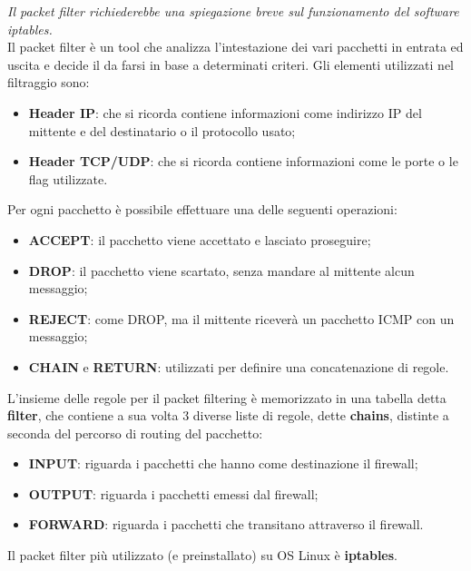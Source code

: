            \emph{Il packet filter richiederebbe una spiegazione breve sul funzionamento del software iptables.}\\

            Il packet filter è un tool che analizza l’intestazione dei vari pacchetti in entrata ed uscita e decide
            il da farsi in base a determinati criteri. Gli elementi utilizzati nel filtraggio sono:

            \begin{itemize}
                \item \textbf{Header IP}: che si ricorda contiene informazioni come indirizzo IP del mittente e del
                destinatario o il protocollo usato;
                \item \textbf{Header TCP/UDP}: che si ricorda contiene informazioni come le porte o le flag utilizzate.
            \end{itemize}

            Per ogni pacchetto è possibile effettuare una delle seguenti operazioni:

            \begin{itemize}
                \item \textbf{ACCEPT}: il pacchetto viene accettato e lasciato proseguire;
                \item \textbf{DROP}: il pacchetto viene scartato, senza mandare al mittente alcun messaggio;
                \item \textbf{REJECT}: come DROP, ma il mittente riceverà un pacchetto ICMP con un messaggio;
                \item \textbf{CHAIN} e \textbf{RETURN}: utilizzati per definire una concatenazione di regole.
            \end{itemize}

            L’insieme delle regole per il packet filtering è memorizzato in una tabella detta \textbf{filter}, che
            contiene a sua volta 3 diverse liste di regole, dette \textbf{chains}, distinte a seconda del percorso di
            routing del pacchetto:

            \begin{itemize}
                \item \textbf{INPUT}: riguarda i pacchetti che hanno come destinazione il firewall;
                \item \textbf{OUTPUT}: riguarda i pacchetti emessi dal firewall;
                \item \textbf{FORWARD}: riguarda i pacchetti che transitano attraverso il firewall.
            \end{itemize}

            Il packet filter più utilizzato (e preinstallato) su OS Linux è \textbf{iptables}.